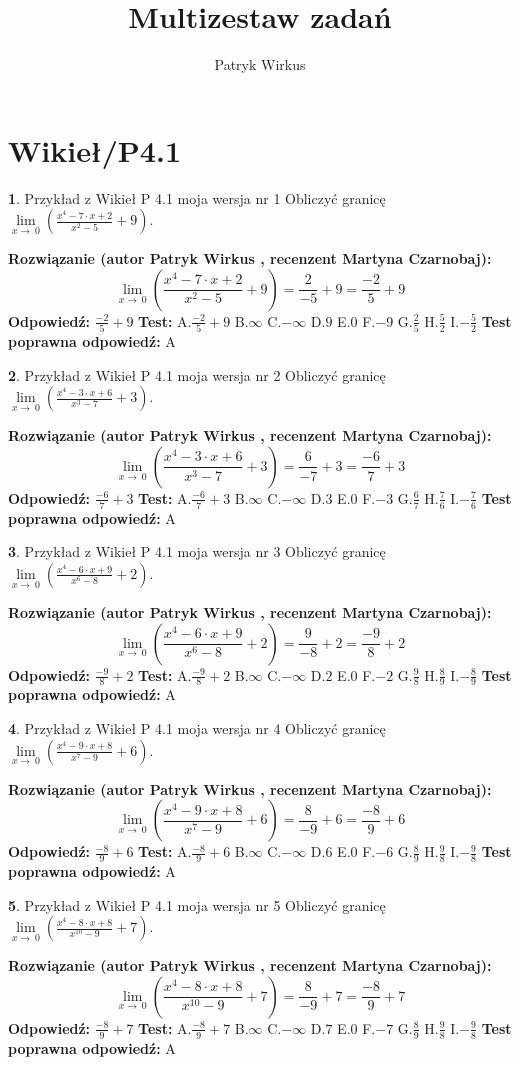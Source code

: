 \documentclass[12pt, a4paper]{article}
\title{Multizestaw zadań}
\author{Patryk Wirkus}
\date{}
\theoremstyle{definition} %
\newtheorem{zad}{}
\newcommand{\kategoria}[1]{\section{#1}}
\newcommand{\zadStart}[1]{\begin{zad}#1\newline}
\newcommand{\zadStop}{\end{zad}}
\newcommand{\rozwStart}[2]{\noindent \textbf{Rozwiązanie (autor #1 , recenzent #2): }\newline}
\newcommand{\rozwStop}{\newline}
\newcommand{\odpStart}{\noindent \textbf{Odpowiedź:}\newline}
\newcommand{\odpStop}{\newline}
\newcommand{\testStart}{\noindent \textbf{Test:}\newline}
\newcommand{\testStop}{\newline}
\newcommand{\kluczStart}{\noindent \textbf{Test poprawna odpowiedź:}\newline}
\newcommand{\kluczStop}{\newline}
\begin{document}
\maketitle

\kategoria{Wikieł/P4.1}


\zadStart{Przykład z Wikieł P 4.1 moja wersja nr 1}
Obliczyć granicę $\lim\limits_{x\to\ 0}(\frac{x^{4}-7 \cdot x +2}{x^{2}-5}+9)$.
\zadStop
\rozwStart{Patryk Wirkus}{Martyna Czarnobaj}
$$\lim\limits_{x\to\ 0}(\frac{x^{4}-7 \cdot x +2}{x^{2}-5}+9)=\frac{2}{-5}+9=\frac{-2}{5}+9$$
\rozwStop
\odpStart
$\frac{-2}{5}+9$
\odpStop
\testStart
A.$\frac{-2}{5}+9$
B.$\infty$
C.$-\infty$
D.$9$
E.$0$
F.$-9$
G.$\frac{2}{5}$
H.$\frac{5}{2}$
I.$-\frac{5}{2}$
\testStop
\kluczStart
A
\kluczStop



\zadStart{Przykład z Wikieł P 4.1 moja wersja nr 2}
Obliczyć granicę $\lim\limits_{x\to\ 0}(\frac{x^{4}-3 \cdot x +6}{x^{3}-7}+3)$.
\zadStop
\rozwStart{Patryk Wirkus}{Martyna Czarnobaj}
$$\lim\limits_{x\to\ 0}(\frac{x^{4}-3 \cdot x +6}{x^{3}-7}+3)=\frac{6}{-7}+3=\frac{-6}{7}+3$$
\rozwStop
\odpStart
$\frac{-6}{7}+3$
\odpStop
\testStart
A.$\frac{-6}{7}+3$
B.$\infty$
C.$-\infty$
D.$3$
E.$0$
F.$-3$
G.$\frac{6}{7}$
H.$\frac{7}{6}$
I.$-\frac{7}{6}$
\testStop
\kluczStart
A
\kluczStop



\zadStart{Przykład z Wikieł P 4.1 moja wersja nr 3}
Obliczyć granicę $\lim\limits_{x\to\ 0}(\frac{x^{4}-6 \cdot x +9}{x^{6}-8}+2)$.
\zadStop
\rozwStart{Patryk Wirkus}{Martyna Czarnobaj}
$$\lim\limits_{x\to\ 0}(\frac{x^{4}-6 \cdot x +9}{x^{6}-8}+2)=\frac{9}{-8}+2=\frac{-9}{8}+2$$
\rozwStop
\odpStart
$\frac{-9}{8}+2$
\odpStop
\testStart
A.$\frac{-9}{8}+2$
B.$\infty$
C.$-\infty$
D.$2$
E.$0$
F.$-2$
G.$\frac{9}{8}$
H.$\frac{8}{9}$
I.$-\frac{8}{9}$
\testStop
\kluczStart
A
\kluczStop



\zadStart{Przykład z Wikieł P 4.1 moja wersja nr 4}
Obliczyć granicę $\lim\limits_{x\to\ 0}(\frac{x^{4}-9 \cdot x +8}{x^{7}-9}+6)$.
\zadStop
\rozwStart{Patryk Wirkus}{Martyna Czarnobaj}
$$\lim\limits_{x\to\ 0}(\frac{x^{4}-9 \cdot x +8}{x^{7}-9}+6)=\frac{8}{-9}+6=\frac{-8}{9}+6$$
\rozwStop
\odpStart
$\frac{-8}{9}+6$
\odpStop
\testStart
A.$\frac{-8}{9}+6$
B.$\infty$
C.$-\infty$
D.$6$
E.$0$
F.$-6$
G.$\frac{8}{9}$
H.$\frac{9}{8}$
I.$-\frac{9}{8}$
\testStop
\kluczStart
A
\kluczStop



\zadStart{Przykład z Wikieł P 4.1 moja wersja nr 5}
Obliczyć granicę $\lim\limits_{x\to\ 0}(\frac{x^{4}-8 \cdot x +8}{x^{10}-9}+7)$.
\zadStop
\rozwStart{Patryk Wirkus}{Martyna Czarnobaj}
$$\lim\limits_{x\to\ 0}(\frac{x^{4}-8 \cdot x +8}{x^{10}-9}+7)=\frac{8}{-9}+7=\frac{-8}{9}+7$$
\rozwStop
\odpStart
$\frac{-8}{9}+7$
\odpStop
\testStart
A.$\frac{-8}{9}+7$
B.$\infty$
C.$-\infty$
D.$7$
E.$0$
F.$-7$
G.$\frac{8}{9}$
H.$\frac{9}{8}$
I.$-\frac{9}{8}$
\testStop
\kluczStart
A
\kluczStop
\end{document}
